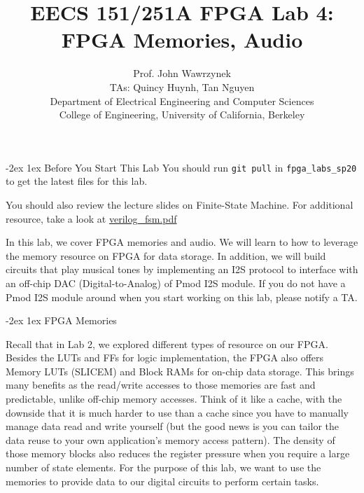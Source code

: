 \documentclass[11pt]{article}
\makeatletter
\renewcommand{\section}
{\@startsection {section}{1}{0pt}
 {-2ex}
 {1ex}
 {\bfseries\Large}}
\makeatother
\begin{document}
\def\PYZsq{\textquotesingle}
\title{\vspace{-0.4in}\Large \bf EECS 151/251A FPGA Lab 4:\\FPGA Memories, Audio\vspace{-0.1in}}

\author{Prof. John Wawrzynek \\
TAs: Quincy Huynh, Tan Nguyen \\ Department of Electrical Engineering and Computer Sciences\\
College of Engineering, University of California, Berkeley}
\date{}
\maketitle

\section{Before You Start This Lab}\label{sec:begin}
You should run \verb|git pull| in \verb|fpga_labs_sp20| to get the latest files for this lab.

You should also review the lecture slides on Finite-State Machine. For additional resource, take a look at \href{http://inst.eecs.berkeley.edu/~eecs151/sp20/files/verilog/verilog\_fsm.pdf}{verilog\_fsm.pdf}

In this lab, we cover FPGA memories and audio. We will learn to how to leverage the memory resource on FPGA for data storage. In addition, we will build circuits that play musical tones by implementing an I2S protocol to interface with an off-chip DAC (Digital-to-Analog) of Pmod I2S module. If you do not have a Pmod I2S module around when you start working on this lab, please notify a TA.

\section{FPGA Memories}

Recall that in Lab 2, we explored different types of resource on our FPGA. Besides the LUTs and FFs for logic implementation, the FPGA also offers Memory LUTs (SLICEM) and Block RAMs for on-chip data storage. This brings many benefits as the read/write accesses to those memories are fast and predictable, unlike off-chip memory accesses. Think of it like a cache, with the downside that it is much harder to use than a cache since you have to manually manage data read and write yourself (but the good news is you can tailor the data reuse to your own application's memory access pattern). The density of those memory blocks also reduces the register pressure when you require a large number of state elements. For the purpose of this lab, we want to use the memories to provide data to our digital circuits to perform certain tasks.
\end{document}
